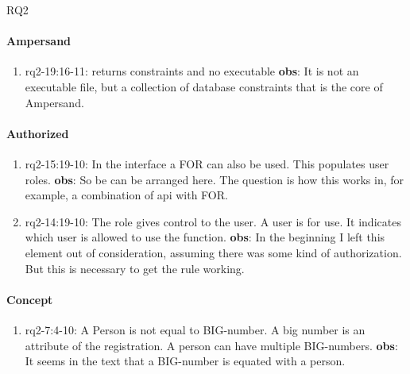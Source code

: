 \def\rq{RQ2}

\acrlong{\rq}
\paragraph{Ampersand}
\begin{enumerate}
    \item rq2-19:16-11:  returns constraints and no executable
    \newline\textbf{obs}: It is not an executable file, but a collection of database constraints that is the core of Ampersand.

\end{enumerate}

\paragraph{Authorized}
\begin{enumerate}
    \item rq2-15:19-10: In the {interface} a FOR can also be used.
    This populates user roles.
    \newline\textbf{obs}: So be  can be arranged here.
    The question is how this works in, for example, a combination of api with FOR.

    \item rq2-14:19-10: The role gives control to the user.
    A user is  for use.
    It indicates which user is allowed to use the function.
    \newline\textbf{obs}: In the beginning I left this element out of consideration, assuming there was some kind of authorization.
    But this is necessary to get the {rule} working.

\end{enumerate}

\paragraph{Concept}
\begin{enumerate}
    \item rq2-7:4-10: A  Person is not equal to BIG-number.
    A big number is an attribute of the registration.
    A person can have multiple BIG-numbers.
    \newline\textbf{obs}: It seems in the text that a BIG-number is equated with a person.

\end{enumerate}

